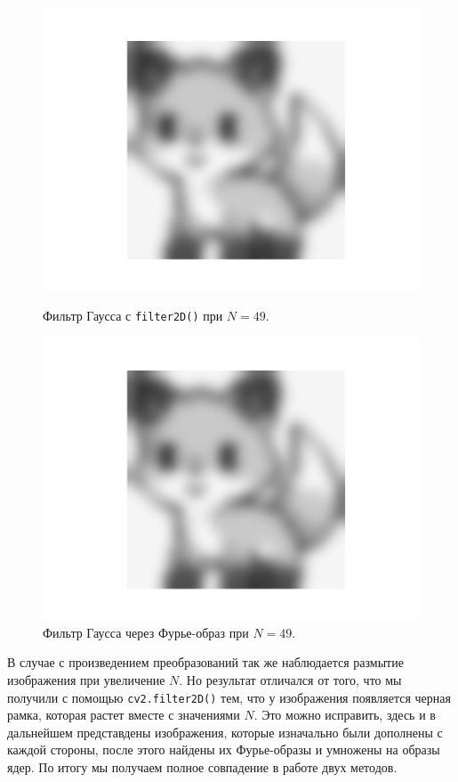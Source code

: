 \documentclass[a4paper]{article}
\begin{document}
\begin{figure}[H]
  \centering
  \begin{minipage}{0.49\textwidth}
    \centering
    \includegraphics[width=\textwidth]{src/gauss_49.png}
    \caption{Фильтр Гаусса с \texttt{filter2D()} при $N=49$.}
  \end{minipage}
  \begin{minipage}{0.49\textwidth}
    \centering
    \includegraphics[width=\textwidth]{src/ifft_gauss_49.png}
    \caption{Фильтр Гаусса через Фурье-образ при $N=49$.}
  \end{minipage}
\end{figure}

\noindent В случае с произведением преобразований так же наблюдается размытие изображения при увеличение $N$. Но результат отличался от того, что мы получили с помощью \texttt{cv2.filter2D()} тем, что у изображения появляется черная рамка, которая растет вместе с значениями $N$. Это можно исправить, здесь и в дальнейшем представдены изображения, которые изначально были дополнены с каждой стороны, после этого найдены их Фурье-образы и умножены на образы ядер. По итогу мы получаем полное совпадение в работе двух методов.
\end{document}
